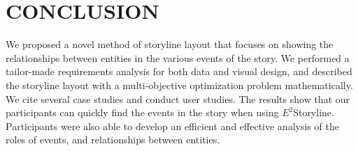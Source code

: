 \documentclass[review,journal]{vgtc}         %
\begin{document}
\section{CONCLUSION}
\noindent We proposed a novel method of storyline layout that focuses on showing the relationships between entities in the various events of the story. We performed a tailor-made requirements analysis for both data and visual design, and described the storyline layout with a multi-objective optimization problem mathematically. We cite several case studies and conduct user studies. The results show that our participants can quickly find the events in the story when using $E^2$Storyline. Participants were also able to develop an efficient and effective analysis of the roles of events, and relationships between entities.




%

%
%
%


\end{document}
